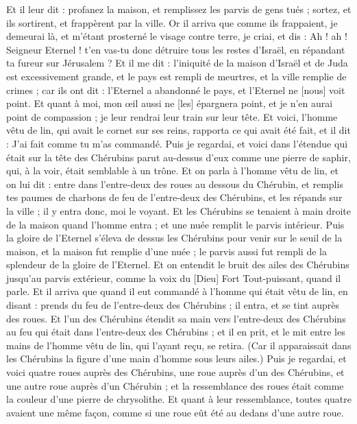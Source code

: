 \begin{multicols}{2}
Et il leur dit : profanez la maison, et remplissez les parvis de gens tués ; sortez, et ils sortirent, et frappèrent par la ville.
Or il arriva que comme ils frappaient, je demeurai là, et m'étant prosterné le visage contre terre, je criai, et dis : Ah ! ah ! Seigneur Eternel ! t'en vas-tu donc détruire tous les restes d'Israël, en répandant ta fureur sur Jérusalem ?
Et il me dit : l'iniquité de la maison d'Israël et de Juda est excessivement grande, et le pays est rempli de meurtres, et la ville remplie de crimes ; car ils ont dit : l'Eternel a abandonné le pays, et l'Eternel ne [nous] voit point.
Et quant à moi, mon œil aussi ne [les] épargnera point, et je n'en aurai point de compassion ; je leur rendrai leur train sur leur tête.
Et voici, l'homme vêtu de lin, qui avait le cornet sur ses reins, rapporta ce qui avait été fait, et il dit : J'ai fait comme tu m'as commandé.
\VerseOne{}Puis je regardai, et voici dans l'étendue qui était sur la tête des Chérubins parut au-dessus d'eux comme une pierre de saphir, qui, à la voir, était semblable à un trône.
Et on parla à l'homme vêtu de lin, et on lui dit : entre dans l'entre-deux des roues au dessous du Chérubin, et remplis tes paumes de charbons de feu de l'entre-deux des Chérubins, et les répands sur la ville ; il y entra donc, moi le voyant.
Et les Chérubins se tenaient à main droite de la maison quand l'homme entra ; et une nuée remplit le parvis intérieur.
Puis la gloire de l'Eternel s'éleva de dessus les Chérubins pour venir sur le seuil de la maison, et la maison fut remplie d'une nuée ; le parvis aussi fut rempli de la splendeur de la gloire de l'Eternel.
Et on entendit le bruit des ailes des Chérubins jusqu'au parvis extérieur, comme la voix du [Dieu] Fort Tout-puissant, quand il parle.
Et il arriva que quand il eut commandé à l'homme qui était vêtu de lin, en disant : prends du feu de l'entre-deux des Chérubins ; il entra, et se tint auprès des roues.
Et l'un des Chérubins étendit sa main vers l'entre-deux des Chérubins au feu qui était dans l'entre-deux des Chérubins ; et il en prit, et le mit entre les mains de l'homme vêtu de lin, qui l'ayant reçu, se retira.
(Car il apparaissait dans les Chérubins la figure d'une main d'homme sous leurs ailes.)
Puis je regardai, et voici quatre roues auprès des Chérubins, une roue auprès d'un des Chérubins, et une autre roue auprès d'un Chérubin ; et la ressemblance des roues était comme la couleur d'une pierre de chrysolithe.
Et quant à leur ressemblance, toutes quatre avaient une même façon, comme si une roue eût été au dedans d'une autre roue.

\end{multicols}

